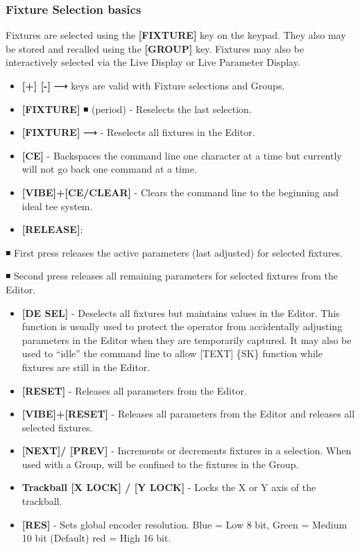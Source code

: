 \documentclass[
]{article}
\begin{document}
\hypertarget{fixture-selection-basics}{%
\subsubsection{Fixture Selection basics}\label{fixture-selection-basics}}

Fixtures are selected using the \textbf{{[}FIXTURE{]}} key on the keypad. They also may be stored and recalled using the \textbf{{[}GROUP{]}} key. Fixtures may also be interactively selected via the Live Display or Live Parameter Display.

\begin{itemize}
\item
  \textbf{{[}+{]} {[}-{]}} ⟶ keys are valid with Fixture selections and Groups.
\item
  \textbf{{[}FIXTURE{]}} ◾ (period) - Reselects the last selection.
\item
  \textbf{{[}FIXTURE{]}} ⟶ - Reselects all fixtures in the Editor.
\item
  \textbf{{[}CE{]}} - Backspaces the command line one character at a time but currently will not go back one command at a time.
\item
  \textbf{{[}VIBE{]}+{[}CE/CLEAR{]}} - Clears the command line to the beginning and ideal tee system.
\item
  \textbf{{[}RELEASE{]}}:
\end{itemize}

◾ First press releases the active parameters (last adjusted) for selected fixtures.

◾ Second press releases all remaining parameters for selected fixtures from the Editor.

\begin{itemize}
\item
  \textbf{{[}DE SEL{]}} - Deselects all fixtures but maintains values in the Editor. This function is usually used to protect the operator from accidentally adjusting parameters in the Editor when they are temporarily captured. It may also be used to ``idle'' the command line to allow {[}TEXT{]} \{SK\} function while fixtures are still in the Editor.
\item
  \textbf{{[}RESET{]}} - Releases all parameters from the Editor.
\item
  \textbf{{[}VIBE{]}+{[}RESET{]}} - Releases all parameters from the Editor and releases all selected fixtures.
\item
  \textbf{{[}NEXT{]}/ {[}PREV{]}} - Increments or decrements fixtures in a selection. When used with a Group, will be confined to the fixtures in the Group.
\item
  \textbf{Trackball {[}X LOCK{]} / {[}Y LOCK{]}} - Locks the X or Y axis of the trackball.
\item
  \textbf{{[}RES{]}} - Sets global encoder resolution. {Blue} = Low 8 bit, {Green} = Medium 10 bit (Default) {red} = High 16 bit.
\end{itemize}
\end{document}
